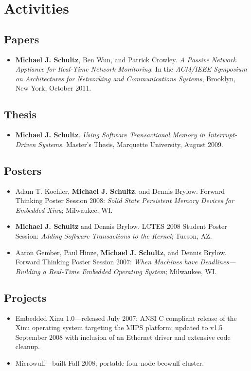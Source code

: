 \documentclass[12pt]{article}
\begin{document}
\section*{Activities}

\subsection*{Papers}
\begin{itemize}
    \item {\bf Michael J. Schultz}, Ben Wun, and Patrick Crowley. {\em A
    Passive Network Appliance for Real-Time Network Monitoring.} In the
    {\em ACM/IEEE Symposium on Architectures for Networking and
    Communications Systems}, Brooklyn, New York, October 2011.
\end{itemize}

\subsection*{Thesis}
\begin{itemize}
    \item {\bf Michael J. Schultz}. {\em Using Software Transactional Memory in
    Interrupt-Driven Systems.}  Master's Thesis, Marquette University, August
    2009.
\end{itemize}

\subsection*{Posters}
\begin{itemize}
    \item Adam T. Koehler, {\bf Michael J. Schultz}, and Dennis Brylow. Forward
    Thinking Poster Session 2008: {\em Solid State Persistent Memory Devices for
    Embedded Xinu}; Milwaukee, WI.
    \item {\bf Michael J. Schultz} and Dennis Brylow.  LCTES 2008 Student Poster
    Session: {\em Adding Software Transactions to the Kernel}; Tucson, AZ.
    \item Aaron Gember, Paul Hinze, {\bf Michael J. Schultz}, and Dennis Brylow.
    Forward Thinking Poster Session 2007: {\em When Machines have
    Deadlines---Building a Real-Time Embedded Operating System}; Milwaukee, WI.
\end{itemize}

\subsection*{Projects}
\begin{itemize}
	\item Embedded Xinu 1.0---released July 2007; ANSI C compliant release
	of the Xinu operating system targeting the MIPS platform; updated to
	v1.5 September 2008 with inclusion of an Ethernet driver and extensive
	code cleanup.
	\item Microwulf---built Fall 2008; portable four-node beowulf cluster.
\end{itemize}
\end{document}
